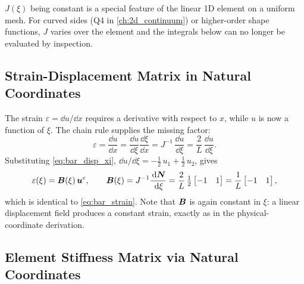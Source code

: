 \begin{remark}
$J(\xi)$ being constant is a special feature of the linear 1D element on
a uniform mesh. For curved sides (Q4 in \cref{ch:2d_continuum}) or
higher-order shape functions, $J$ varies over the element and the
integrals below can no longer be evaluated by inspection.
\end{remark}

\subsection{Strain-Displacement Matrix in Natural Coordinates}

The strain $\varepsilon = \dd u/\dd x$ requires a derivative with respect
to $x$, while $u$ is now a function of $\xi$. The chain rule supplies the
missing factor:
\begin{equation}
    \varepsilon
    = \frac{\dd u}{\dd x}
    = \frac{\dd u}{\dd\xi}\frac{\dd\xi}{\dd x}
    = J^{-1}\,\frac{\dd u}{\dd\xi}
    = \frac{2}{L}\,\frac{\dd u}{\dd\xi}.
\end{equation}
Substituting \cref{eq:bar_disp_xi}, $\dd u/\dd\xi
= -\tfrac{1}{2}\,u_1 + \tfrac{1}{2}\,u_2$, gives
\begin{equation}
    \varepsilon(\xi) = \bm{B}(\xi)\,\bm{u}^e,
    \qquad
    \bm{B}(\xi) = J^{-1}\frac{\,\mathrm{d} \bm{N}}{\,\mathrm{d}\xi}
    = \frac{2}{L}\,\tfrac{1}{2}\begin{bmatrix} -1 & 1 \end{bmatrix}
    = \frac{1}{L}\begin{bmatrix} -1 & 1 \end{bmatrix} ,
    \label{eq:bar_B_xi}
\end{equation}
which is identical to \cref{eq:bar_strain}. Note that $\bm{B}$ is again
constant in $\xi$: a linear displacement field produces a constant strain,
exactly as in the physical-coordinate derivation.

\subsection{Element Stiffness Matrix via Natural Coordinates}


